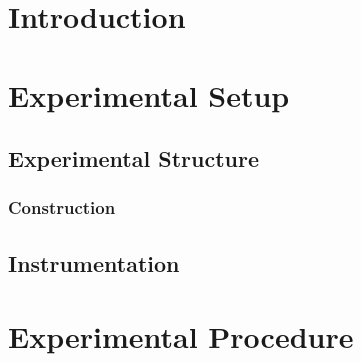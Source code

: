 \documentclass[12pt,oneside]{book}
\begin{document}
\mainmatter

\chapter{Introduction}
\label{chap:Introduction}

\chapter{Experimental Setup}
\label{chap:Experimental_Setup}

\section{Experimental Structure}
\label{sec:Experimental_Structure}

\subsection{Construction}
\label{sec:Construction}

\section{Instrumentation}
\label{sec:Instrumentation}

\chapter{Experimental Procedure}
\label{chap:Experimental_Procedure}
\end{document}
